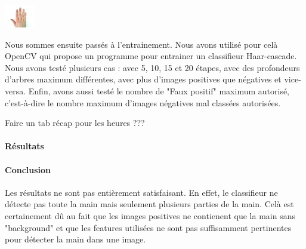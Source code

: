 \documentclass[11pt]{article}
\begin{document}
\begin{minipage}[t]{0.5\textwidth}
    \begin{center}
        \includegraphics[width=\textwidth]{images/ex_pos.jpg}
    \end{center}
\end{minipage}

Nous sommes ensuite passés à l'entrainement. Nous avons utilisé pour celà OpenCV qui propose un programme pour entrainer un classifieur Haar-cascade. Nous avons testé plusieurs cas : avec 5, 10, 15 et 20 étapes, avec des profondeurs d'arbres maximum différentes, avec plus d'images positives que négatives et vice-versa. Enfin, avons aussi testé le nombre de "Faux positif" maximum autorisé, c'est-à-dire le nombre maximum d'images négatives mal classées autorisées. \bigbreak

Faire un tab récap pour les heures ??? \bigbreak

\paragraph{Résultats}

\paragraph{Conclusion}
Les résultats ne sont pas entièrement satisfaisant. En effet, le classifieur ne détecte pas toute la main mais seulement plusieurs parties de la main. Celà est certainement dû au fait que les images positives ne contienent que la main sans "background" et que les features utilisées ne sont pas suffisamment pertinentes pour détecter la main dans une image. \bigbreak
\end{document}
